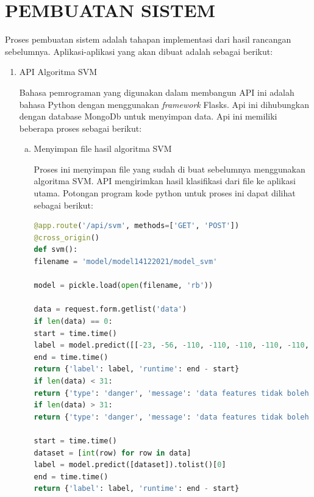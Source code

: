 \section{PEMBUATAN SISTEM}
\par Proses pembuatan sistem adalah tahapan implementasi dari hasil rancangan sebelumnya. Aplikasi-aplikasi yang akan dibuat adalah sebagai berikut:
\begin{enumerate}[1.]
	\item API Algoritma SVM
	      \par Bahasa pemrograman yang digunakan dalam membangun API ini adalah bahasa Python dengan menggunakan \textit{framework} Flasks.  Api ini dihubungkan dengan database MongoDb untuk menyimpan data. Api ini memiliki beberapa proses sebagai berikut:
	      \begin{enumerate}[a.]
		      \item Menyimpan file hasil algoritma SVM
		            \par Proses ini menyimpan file yang sudah di buat sebelumnya menggunakan algoritma SVM. API mengirimkan hasil klasifikasi dari file ke aplikasi utama. Potongan program kode python untuk proses ini dapat dilihat sebagai berikut:
		            \begin{lstlisting}[language=Python]
@app.route('/api/svm', methods=['GET', 'POST'])
@cross_origin()
def svm():
filename = 'model/model14122021/model_svm'
						
model = pickle.load(open(filename, 'rb'))
						
data = request.form.getlist('data')
if len(data) == 0:
start = time.time()
label = model.predict([[-23, -56, -110, -110, -110, -110, -110, -110, -110, -110, -110, -96,	-100,	-97,	-90,	-90,	-93,	-89,	-95,	-95, -85,	-78,	-95,	-95,	-88, -95,	-110,	-110,	-110,	-110,	-110]]).tolist()[0]
end = time.time()
return {'label': label, 'runtime': end - start}
if len(data) < 31:
return {'type': 'danger', 'message': 'data features tidak boleh dibawah 20'}
if len(data) > 31:
return {'type': 'danger', 'message': 'data features tidak boleh diatas 20'}	

start = time.time()
dataset = [int(row) for row in data]
label = model.predict([dataset]).tolist()[0]
end = time.time()
return {'label': label, 'runtime': end - start}				
								\end{lstlisting}


\end{enumerate}
\end{enumerate}
